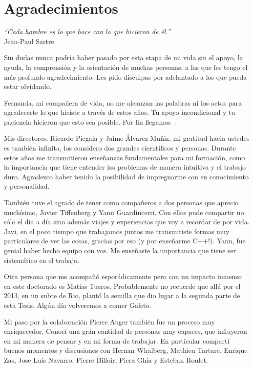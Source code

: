 \chapter*{Agradecimientos}

\begin{flushright}
\emph{``Cada hombre es lo que hace con lo que hicieron de \'el.''}\\
Jean-Paul Sartre\hspace*{2mm}
\end{flushright}
\vspace{1cm}
Sin dudas nunca podr\'ia haber pasado por esta etapa de mi vida sin el apoyo, la ayuda, la comprensi\'on y la orientaci\'on de muchas personas, a las que les tengo el m\'as profundo agradecimiento. Les pido disculpas por adelantado a los que pueda estar olvidando.

Fernanda, mi compa\~nera de vida, no me alcanzan las palabras ni los actos para agradecerte lo que hiciste a trav\'es de estos a\~nos. Tu apoyo incondicional y tu paciencia hicieron que esto sea posible. Por fin llegamos~\smiley{}.

Mis directores, Ricardo Piegaia y Jaime \'Alvarez-Mu\~niz, mi gratitud hacia ustedes es tambi\'en infinita, los considero dos grandes ciernt\'ificos y personas.
Durante estos a\~nos me transmitieron ense\~nanzas fundamentales para mi formaci\'on, como la importancia que tiene entender los problemas de manera intuitiva y el trabajo duro. 
Agradezco haber tenido la posibilidad de impregnarme con su conocimiento y personalidad.

Tambi\'en tuve el agrado de tener como compa\~neros a dos personas que aprecio much\'isimo, Javier Tiffenberg y Yann Guardincerri. Con ellos pude compartir no s\'olo el d\'ia a d\'ia sino adem\'as viajes y experiencias que voy a recordar de por vida.
Javi, en el poco tiempo que trabajamos juntos me transmitiste formas muy particulares de ver las cosas, gracias por eso (y por ense\~narme C++!).
Yann, fue genial haber hecho equipo con vos. Me ense\~naste la importancia que tiene ser sistem\'atico en el trabajo.

Otra persona que me acompa\~n\'o espor\'adicamente pero con un impacto inmenso en este doctorado es Matias Tueros.
Probablemente no recuerde que all\'a por el 2013, en un subte de Rio, plant\'o la semilla que dio lugar a la segunda parte de esta Tesis. Alg\'un d\'ia volveremos a comer Galeto.

Mi paso por la colaboraci\'on Pierre Auger tambi\'en fue un proceso muy enriquecedor. Conoc\'i una gr\'an cantidad de personas muy capaces, que influyeron en mi manera de pensar y en mi forma de trabajar.
En particular compart\'i buenos momentos y discusiones con Hernan Whalberg, Mathieu Tartare, Enrique Zas, Jose Luis Navarro, Pierre Billoir, Piera Ghia y Esteban Roulet.

